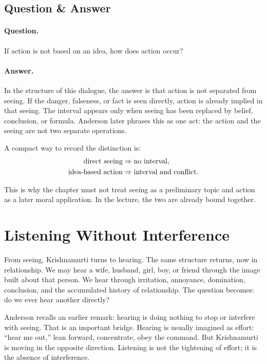 \subsection{Question \& Answer}

\paragraph{Question.}
If action is not based on an idea, how does action occur?

\paragraph{Answer.}
In the structure of this dialogue, the answer is that action is not separated from seeing. If the danger, falseness, or fact is seen directly, action is already implied in that seeing. The interval appears only when seeing has been replaced by belief, conclusion, or formula. Anderson later phrases this as one act: the action and the seeing are not two separate operations.

A compact way to record the distinction is:
\begin{align}
\hbox{direct seeing} &\Rightarrow \hbox{no interval},\\
\hbox{idea-based action} &\Rightarrow \hbox{interval and conflict}.
\end{align}

This is why the chapter must not treat seeing as a preliminary topic and action as a later moral application. In the lecture, the two are already bound together.

\section{Listening Without Interference}

From seeing, Krishnamurti turns to hearing. The same structure returns, now in relationship. We may hear a wife, husband, girl, boy, or friend through the image built about that person. We hear through irritation, annoyance, domination, conclusion, and the accumulated history of relationship. The question becomes: do we ever hear another directly?

Anderson recalls an earlier remark: hearing is doing nothing to stop or interfere with seeing. That is an important bridge. Hearing is usually imagined as effort: ``hear me out,'' lean forward, concentrate, obey the command. But Krishnamurti is moving in the opposite direction. Listening is not the tightening of effort; it is the absence of interference.

